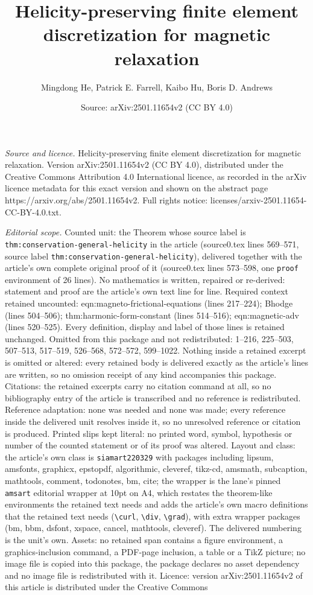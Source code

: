 \documentclass[10pt,a4paper]{amsart}
\title[Helicity-preserving finite element discretization for magnet]{Helicity-preserving finite element discretization for magnetic relaxation}
\author{Mingdong He, Patrick E. Farrell, Kaibo Hu, Boris D. Andrews}
\date{Source: arXiv:2501.11654v2 (CC BY 4.0)}
\begin{document}
\maketitle

\noindent\emph{Source and licence.} Helicity-preserving finite element discretization for magnetic relaxation. Version arXiv:2501.11654v2 (CC BY 4.0), distributed under the Creative Commons Attribution 4.0 International licence, as recorded in the arXiv licence metadata for this exact version and shown on the abstract page https://arxiv.org/abs/2501.11654v2. Full rights notice: licenses/arxiv-2501.11654-CC-BY-4.0.txt.\par\smallskip

\noindent\textit{Editorial scope.} Counted unit: the Theorem whose source label is \texttt{thm:conservation-general-helicity} in the article (source0.tex lines 569--571, source label \texttt{thm:conservation-general-helicity}), delivered together with the article's own complete original proof of it (source0.tex lines 573--598, one \texttt{proof} environment of 26 lines). No mathematics is written, repaired or re-derived: statement and proof are the article's own text line for line. Required context retained uncounted: eqn:magneto-frictional-equations (lines 217--224); Bhodge (lines 504--506); thm:harmonic-form-constant (lines 514--516); eqn:magnetic-adv (lines 520--525). Every definition, display and label of those lines is retained unchanged. Omitted from this package and not redistributed: 1--216, 225--503, 507--513, 517--519, 526--568, 572--572, 599--1022. Nothing inside a retained excerpt is omitted or altered: every retained body is delivered exactly as the article's lines are written, so no omission receipt of any kind accompanies this package. Citations: the retained excerpts carry no citation command at all, so no bibliography entry of the article is transcribed and no reference is redistributed. Reference adaptation: none was needed and none was made; every reference inside the delivered unit resolves inside it, so no unresolved reference or citation is produced. Printed slips kept literal: no printed word, symbol, hypothesis or number of the counted statement or of its proof was altered. Layout and class: the article's own class is \texttt{siamart220329} with packages including lipsum, amsfonts, graphicx, epstopdf, algorithmic, cleveref, tikz-cd, amsmath, subcaption, mathtools, comment, todonotes, bm, cite; the wrapper is the lane's pinned \texttt{amsart} editorial wrapper at 10pt on A4, which restates the theorem-like environments the retained text needs and adds the article's own macro definitions that the retained text needs (\texttt{\textbackslash curl}, \texttt{\textbackslash div}, \texttt{\textbackslash grad}), with extra wrapper packages (bm, bbm, dsfont, xspace, cancel, mathtools, cleveref). The delivered numbering is the unit's own. Assets: no retained span contains a figure environment, a graphics-inclusion command, a PDF-page inclusion, a table or a TikZ picture; no image file is copied into this package, the package declares no asset dependency and no image file is redistributed with it. Licence: version arXiv:2501.11654v2 of this article is distributed under the Creative Commons 
\end{document}
